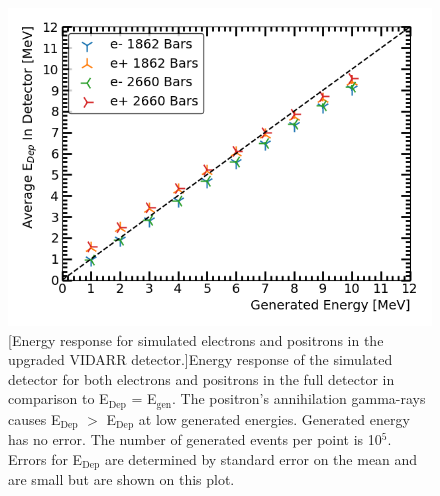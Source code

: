 \begin{figure}[!h]
 \centering
 \includegraphics[width=0.7\linewidth]{Chapter4/Figs/summedVsTruth_1862_2660_e-e+_eBars_Adjusted.png}
 [Energy response for simulated electrons and positrons in the upgraded VIDARR detector.]{Energy response of the simulated detector for both electrons and positrons in the full detector in comparison to E$_\textrm{{Dep}}$ = E$_\textrm{{gen}}$. The positron's annihilation gamma-rays causes E$_\textrm{{Dep}}$ $>$ E$_\textrm{{Dep}}$ at low generated energies. Generated energy has no error. The number of generated events per point is 10$^5$. Errors for E$_\textrm{{Dep}}$ are determined by standard error on the mean and are small but are shown on this plot.}
 \label{fig:recon_gen_ele_pos}
\end{figure} 

